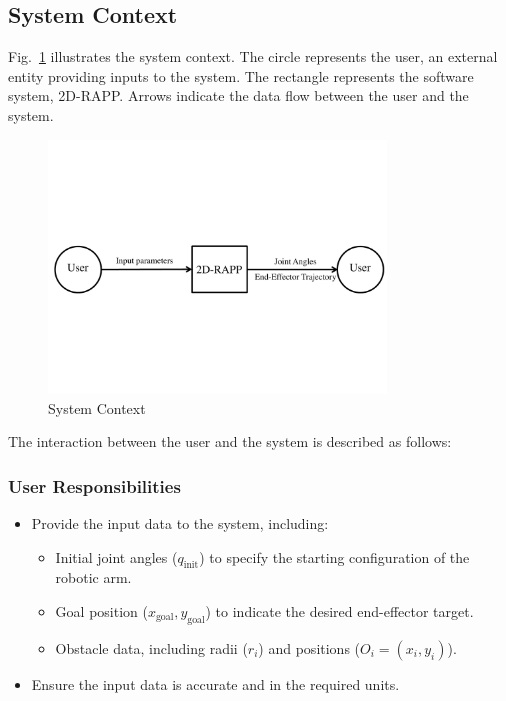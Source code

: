 \documentclass[12pt]{article}
\begin{document}
\subsection{System Context}


Fig.~\ref{Fig:SysCon} illustrates the system context. The circle represents the user, an external entity providing inputs to the system. The rectangle represents the software system, 2D-RAPP. Arrows indicate the data flow between the user and the system.

\begin{figure}[h!]
\centering
\includegraphics[width=0.8\textwidth]{SystemContextFigure}
\caption{System Context}
\label{Fig:SysCon}
\end{figure}

The interaction between the user and the system is described as follows:

\subsubsection*{User Responsibilities}
\begin{itemize}
    \item Provide the input data to the system, including:
    \begin{itemize}
        \item Initial joint angles (\(q_{\text{init}}\)) to specify the starting configuration of the robotic arm.
        \item Goal position (\(x_{\text{goal}}, y_{\text{goal}}\)) to indicate the desired end-effector target.
        \item Obstacle data, including radii (\(r_i\)) and positions (\(O_i = (x_i, y_i)\)).
    \end{itemize}
    \item Ensure the input data is accurate and in the required units.
\end{itemize}
\end{document}

